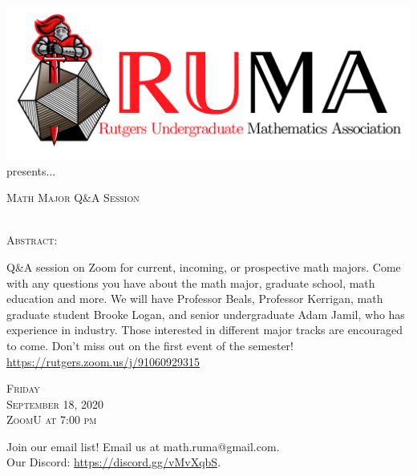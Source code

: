 \documentclass[12pt]{article}
\begin{document}

\begin{center}\includegraphics[scale=.45]{RUMAlogo.png}\\
\large  presents... \\

\vspace{2mm}
\begin{spacing}{1}
{\fontsize{40}{44}\selectfont  \textsc{
Math Major Q\&A Session}} \end{spacing}
 

 ~~\\

\normalsize
\textsc{Abstract:}

\LARGE 
Q\&A session on Zoom for
current, incoming, or prospective math 
majors. Come with any questions you have about the math
major, graduate school, math education and more. We will
have Professor Beals, Professor Kerrigan, math graduate student
Brooke Logan,
and senior undergraduate Adam Jamil, who has experience in
industry. Those
interested in different major tracks are encouraged to come. Don't
miss out on the first event of the semester!\\
\vspace{2mm}
\url{https://rutgers.zoom.us/j/91060929315}

\vspace{5mm} 
\Huge   \textsc{Friday \\September 18, 2020 \\ZoomU at 7:00 pm}
\end{center}
\begin{center}
\Large  Join our email list! Email us at math.ruma@gmail.com. \\Our
Discord: \url{https://discord.gg/vMvXqbS}.\\
\end{center}
\end{document}
